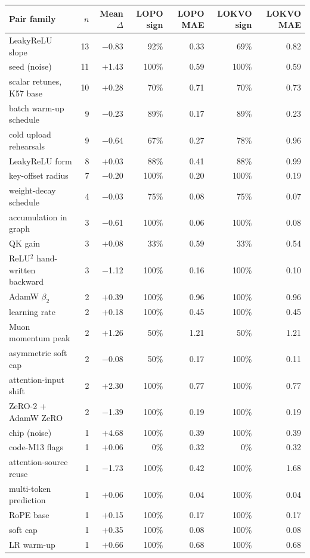 {\footnotesize
\begin{tabular}{@{}p{4.4cm}rrrrrr@{}}
\toprule
Pair family & $n$ & Mean $\Delta$ & LOPO sign & LOPO MAE & LOKVO sign & LOKVO MAE \\
\midrule
LeakyReLU slope & 13 & \ensuremath{-}0.83 & 92\% & 0.33 & 69\% & 0.82 \\
seed (noise) & 11 & \ensuremath{+}1.43 & 100\% & 0.59 & 100\% & 0.59 \\
scalar retunes, K57 base & 10 & \ensuremath{+}0.28 & 70\% & 0.71 & 70\% & 0.73 \\
batch warm-up schedule & 9 & \ensuremath{-}0.23 & 89\% & 0.17 & 89\% & 0.23 \\
cold upload rehearsals & 9 & \ensuremath{-}0.64 & 67\% & 0.27 & 78\% & 0.96 \\
LeakyReLU form & 8 & \ensuremath{+}0.03 & 88\% & 0.41 & 88\% & 0.99 \\
key-offset radius & 7 & \ensuremath{-}0.20 & 100\% & 0.20 & 100\% & 0.19 \\
weight-decay schedule & 4 & \ensuremath{-}0.03 & 75\% & 0.08 & 75\% & 0.07 \\
accumulation in graph & 3 & \ensuremath{-}0.61 & 100\% & 0.06 & 100\% & 0.08 \\
QK gain & 3 & \ensuremath{+}0.08 & 33\% & 0.59 & 33\% & 0.54 \\
ReLU$^2$ hand-written backward & 3 & \ensuremath{-}1.12 & 100\% & 0.16 & 100\% & 0.10 \\
AdamW $\beta_2$ & 2 & \ensuremath{+}0.39 & 100\% & 0.96 & 100\% & 0.96 \\
learning rate & 2 & \ensuremath{+}0.18 & 100\% & 0.45 & 100\% & 0.45 \\
Muon momentum peak & 2 & \ensuremath{+}1.26 & 50\% & 1.21 & 50\% & 1.21 \\
asymmetric soft cap & 2 & \ensuremath{-}0.08 & 50\% & 0.17 & 100\% & 0.11 \\
attention-input shift & 2 & \ensuremath{+}2.30 & 100\% & 0.77 & 100\% & 0.77 \\
ZeRO-2 + AdamW ZeRO & 2 & \ensuremath{-}1.39 & 100\% & 0.19 & 100\% & 0.19 \\
chip (noise) & 1 & \ensuremath{+}4.68 & 100\% & 0.39 & 100\% & 0.39 \\
code-M13 flags & 1 & \ensuremath{+}0.06 & 0\% & 0.32 & 0\% & 0.32 \\
attention-source reuse & 1 & \ensuremath{-}1.73 & 100\% & 0.42 & 100\% & 1.68 \\
multi-token prediction & 1 & \ensuremath{+}0.06 & 100\% & 0.04 & 100\% & 0.04 \\
RoPE base & 1 & \ensuremath{+}0.15 & 100\% & 0.17 & 100\% & 0.17 \\
soft cap & 1 & \ensuremath{+}0.35 & 100\% & 0.08 & 100\% & 0.08 \\
LR warm-up & 1 & \ensuremath{+}0.66 & 100\% & 0.68 & 100\% & 0.68 \\
\bottomrule
\end{tabular}
}
